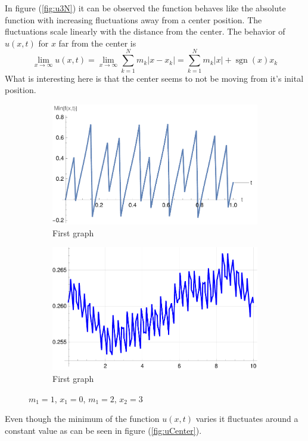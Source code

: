 \documentclass[english,master]{liumaiex}
\theoremstyle{plain}
\theoremstyle{definition}
\DeclareMathOperator{\sgn}{sgn}
\begin{document}
In figure (\ref{fig:u3N}) it can be observed the function behaves like the absolute function with increasing fluctuations away from a center position. The fluctuations scale linearly with the distance from the center. The behavior of $u(x, t)$ for $x$ far from the center is
\begin{equation}
	\lim_{x \to \infty} u(x, t) = \lim_{x \to \infty} \sum_{k = 1}^{N} m_k |x - x_k| = \sum_{k = 1}^{N} m_k |x| + \sgn(x)x_k
\end{equation}
What is interesting here is that the center seems to not be moving from it's inital position.
\begin{figure}[H]
	\begin{subfigure}{0.44\textwidth}
		\includegraphics[width=\textwidth]{graphs/3NInfinite/uMin.pdf}
        \caption{First graph}
    \end{subfigure}
	\hfill
	\begin{subfigure}{0.44\textwidth}
		\includegraphics[width=\textwidth]{graphs/3NInfinite/movingAvg.pdf}
        \caption{First graph}
    \end{subfigure}
    \caption{$m_1 = 1$, $x_1 = 0$, $m_1 = 2$, $x_2 = 3$}
\end{figure}
Even though the minimum of the function $u(x, t)$ varies it fluctuates around a constant value as can be seen in figure (\ref{fig:uCenter}).
\end{document}
